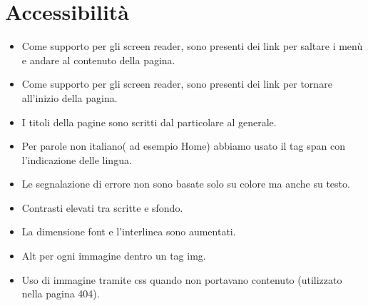 \documentclass[1_relazione.tex]{subfiles}
\begin{document}
    \section{Accessibilit\`{a}}
    \begin{itemize}
        \item Come supporto per gli screen reader, sono presenti dei link per saltare i men\`{u} e andare al contenuto della pagina.

        \item Come supporto per gli screen reader, sono presenti dei link per tornare all'inizio della pagina.

        \item I titoli della pagine sono scritti dal particolare al generale.

        \item Per parole non italiano( ad esempio Home) abbiamo usato il tag span con l'indicazione delle lingua.

        \item Le segnalazione di errore non sono basate solo su colore ma anche su testo.

        \item Contrasti elevati tra scritte e sfondo.

        \item La dimensione font e l'interlinea sono aumentati.

        \item Alt per ogni immagine dentro un tag img.

        \item Uso di immagine tramite css quando non portavano contenuto (utilizzato nella pagina 404).

    \end{itemize}
\end{document}
